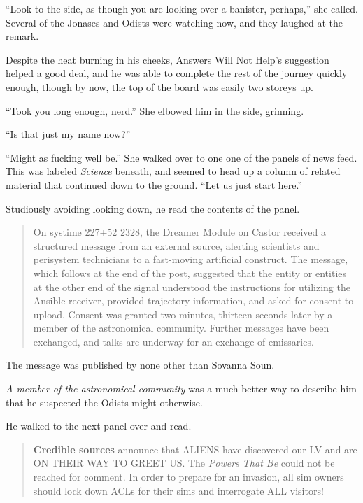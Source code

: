 ``Look to the side, as though you are looking over a banister, perhaps,'' she called. Several of the Jonases and Odists were watching now, and they laughed at the remark.

Despite the heat burning in his cheeks, Answers Will Not Help's suggestion helped a good deal, and he was able to complete the rest of the journey quickly enough, though by now, the top of the board was easily two storeys up.

``Took you long enough, nerd.'' She elbowed him in the side, grinning.

``Is that just my name now?''

``Might as fucking well be.'' She walked over to one one of the panels of news feed. This was labeled \emph{Science} beneath, and seemed to head up a column of related material that continued down to the ground. ``Let us just start here.''

Studiously avoiding looking down, he read the contents of the panel.

\begin{quote}
On systime 227+52 2328, the Dreamer Module on Castor received a structured message from an external source, alerting scientists and perisystem technicians to a fast-moving artificial construct. The message, which follows at the end of the post, suggested that the entity or entities at the other end of the signal understood the instructions for utilizing the Ansible receiver, provided trajectory information, and asked for consent to upload. Consent was granted two minutes, thirteen seconds later by a member of the astronomical community. Further messages have been exchanged, and talks are underway for an exchange of emissaries.
\end{quote}

The message was published by none other than Sovanna Soun.

\emph{A member of the astronomical community} was a much better way to describe him that he suspected the Odists might otherwise.

He walked to the next panel over and read.

\begin{quote}
\textbf{Credible sources} announce that ALIENS have discovered our LV and are ON THEIR WAY TO GREET US. The \emph{Powers That Be} could not be reached for comment. In order to prepare for an invasion, all sim owners should lock down ACLs for their sims and interrogate ALL visitors!
\end{quote}

